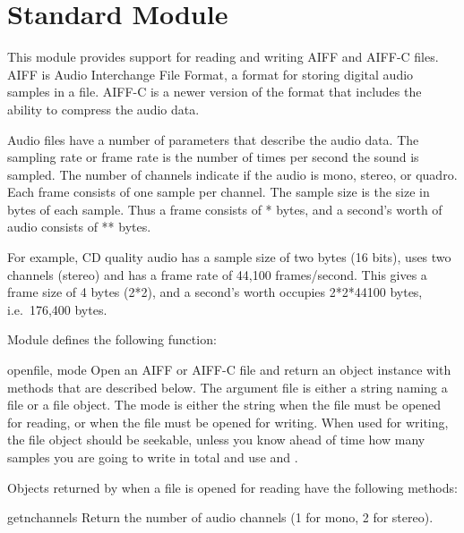 \section{Standard Module }
\label{module-aifc}

This module provides support for reading and writing AIFF and AIFF-C
files.  AIFF is Audio Interchange File Format, a format for storing
digital audio samples in a file.  AIFF-C is a newer version of the
format that includes the ability to compress the audio data.

Audio files have a number of parameters that describe the audio data.
The sampling rate or frame rate is the number of times per second the
sound is sampled.  The number of channels indicate if the audio is
mono, stereo, or quadro.  Each frame consists of one sample per
channel.  The sample size is the size in bytes of each sample.  Thus a
frame consists of * bytes, and a
second's worth of audio consists of
** bytes.

For example, CD quality audio has a sample size of two bytes (16
bits), uses two channels (stereo) and has a frame rate of 44,100
frames/second.  This gives a frame size of 4 bytes (2*2), and a
second's worth occupies 2*2*44100 bytes, i.e.\ 176,400 bytes.

Module  defines the following function:

\begin{funcdesc}{open}{file, mode}
Open an AIFF or AIFF-C file and return an object instance with
methods that are described below.  The argument file is either a
string naming a file or a file object.  The mode is either the string
 when the file must be opened for reading, or 
when the file must be opened for writing.  When used for writing, the
file object should be seekable, unless you know ahead of time how many
samples you are going to write in total and use
 and .
\end{funcdesc}

Objects returned by  when a file is opened for
reading have the following methods:

\begin{funcdesc}{getnchannels}{}
Return the number of audio channels (1 for mono, 2 for stereo).
\end{funcdesc}

